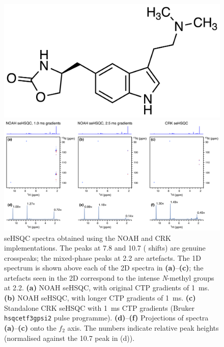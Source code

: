 \begin{figure}
    \centering
    \includegraphics[scale=0.9]{./figures/zolmi.png}\phantom{aaaaaa}

    \includegraphics[width=\textwidth]{./figures/cnst16_diff.png}
    \caption{
        \nitrogen{} seHSQC spectra obtained using the NOAH and CRK implementations.
        The peaks at 7.8 and \SI{10.7}{\ppm} (\proton{} shifts) are genuine crosspeaks; the mixed-phase peaks at \SI{2.2}{\ppm} are artefacts.
        The 1D \proton{} spectrum is shown above each of the 2D spectra in \textbf{(a)}--\textbf{(c)}; the artefacts seen in the 2D correspond to the intense \textit{N}-methyl groups at \SI{2.2}{\ppm}.
        \textbf{(a)} NOAH seHSQC, with original CTP gradients of \SI{1}{\ms}.
        \textbf{(b)} NOAH seHSQC, with longer CTP gradients of \SI{1}{\ms}.
        \textbf{(c)} Standalone CRK seHSQC with \SI{1}{\ms} CTP gradients (Bruker \texttt{hsqcetf3gpsi2} pulse programme).
        \textbf{(d)}--\textbf{(f)} Projections of spectra \textbf{(a)}--\textbf{(c)} onto the $f_2$ axis.
        The numbers indicate relative peak heights (normalised against the \SI{10.7}{\ppm} peak in (d)).
        \zolmi{}
    }
    \label{fig:cnst16_diff}
\end{figure}

